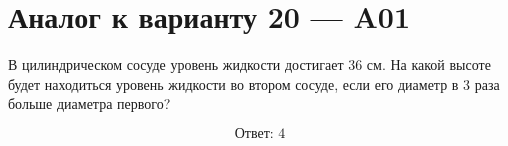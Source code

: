 \documentclass[12pt,a4paper]{article}
\begin{document}
\section*{Аналог к варианту 20 — A01}

В цилиндрическом сосуде уровень жидкости достигает \(36\) см. На какой высоте будет находиться уровень жидкости во втором сосуде, если его диаметр в \(3\) раза больше диаметра первого?

\begin{center}
\end{center}

\[
\boxed{\text{Ответ: }4}
\]
\end{document}
